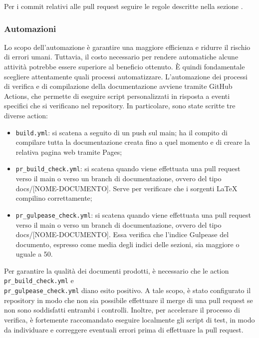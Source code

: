 Per i commit relativi alle pull request seguire le regole descritte nella
sezione .

\subsubsection{Automazioni}\label{inf:automaz}
Lo scopo dell'automazione è garantire una maggiore efficienza e ridurre il
rischio di errori umani. Tuttavia, il costo necessario per rendere automatiche
alcune attività potrebbe essere superiore al beneficio ottenuto. È quindi
fondamentale scegliere attentamente quali processi automatizzare.
L'automazione dei processi di verifica e di compilazione della documentazione
avviene tramite GitHub Actions, che permette di eseguire script personalizzati
in risposta a eventi specifici che si verificano nel repository. In
particolare, sono state scritte tre diverse action:
\begin{itemize}
      \item \texttt{build.yml}: si scatena a seguito di un push sul main; ha il compito di compilare
            tutta la documentazione creata fino a quel momento e di creare la relativa pagina web tramite Pages;
      \item \texttt{pr\_build\_check.yml}: si scatena quando viene effettuata una pull request verso il main o verso
            un branch di documentazione, ovvero del tipo docs/[NOME-DOCUMENTO]. Serve per verificare che
            i sorgenti LaTeX compilino correttamente;
      \item \texttt{pr\_gulpease\_check.yml}: si scatena quando viene effettuata una pull request verso il main o verso
            un branch di documentazione, ovvero del tipo docs/[NOME-DOCUMENTO]. Essa verifica che
            l'indice Gulpease del documento, espresso come media degli indici delle sezioni, sia maggiore o uguale a 50.
\end{itemize}
Per garantire la qualità dei documenti prodotti, è necessario che le action \texttt{pr\_build\_check.yml}
e \\\texttt{pr\_gulpease\_check.yml} diano esito positivo. A tale scopo, è stato configurato il repository in modo
che non sia possibile effettuare il merge di una pull request se non sono soddisfatti entrambi i controlli.
Inoltre, per accelerare il processo di verifica, è fortemente raccomandato eseguire localmente gli script di test,
in modo da individuare e correggere eventuali errori prima di effettuare la pull request.
